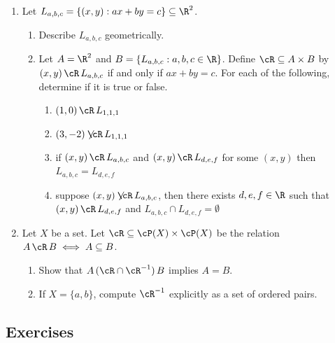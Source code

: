 \begin{enumerate}\renewcommand{\labelenumi}{\thesubsection.\theenumi}
\item Let $L_{a,b,c} = \{(x,y) : ax + by = c\} \subseteq \R^2$. 
\begin{enumerate}
    \item Describe $L_{a,b,c}$ geometrically.
    \item Let $A = \R^2$ and $B = \{L_{a,b,c} : a,b,c \in \R\}$. Define $\cR \subseteq A \times B$ by $(x,y) \, \cR \, L_{a,b,c}$ if and only if $ax + by = c$. For each of the following, determine if it is true or false.
    \begin{enumerate}[label=(\roman*)]
        \item $(1,0) \, \cR \, L_{1,1,1}$
        \item $(3,-2) \not\!\!\cR \, L_{1,1,1}$
        \item if $(x,y) \, \cR \, L_{a,b,c}$ and $(x,y) \, \cR \, L_{d,e,f}$ for some $(x,y)$ then $L_{a,b,c} = L_{d,e,f}$
        \item suppose $(x,y)\not\!\!\cR \, L_{a,b,c}$, then there exists $d,e,f \in \R$ such that $(x,y) \, \cR \, L_{d,e,f}$ and $L_{a,b,c} \cap L_{d,e,f} = \emptyset$
    \end{enumerate}
\end{enumerate}

\item Let $X$ be a set. Let $\cR \subseteq \cP(X) \times \cP(X)$ be the relation $A \, \cR \, B \iff A \subseteq B$.
\begin{enumerate}
    \item Show that $A \, (\cR \cap \cR^{-1}) \, B$ implies $A = B$.
    \item If $X = \{a,b\}$, compute $\cR^{-1}$ explicitly as a set of ordered pairs.
\end{enumerate}
\end{enumerate}

\subsection*{Exercises}

